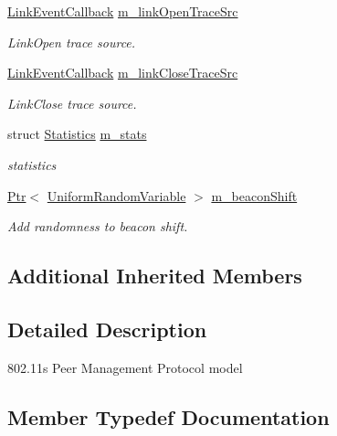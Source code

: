\begin{DoxyCompactItemize}
\hyperlink{classns3_1_1dot11s_1_1PeerManagementProtocol_abd87274ae9ac4498dbd5a8acfe7e9efa}{Link\+Event\+Callback} \hyperlink{classns3_1_1dot11s_1_1PeerManagementProtocol_a33560f4e34a457118de89f3ed3859d4e}{m\+\_\+link\+Open\+Trace\+Src}
\begin{DoxyCompactList}\small\item\em Link\+Open trace source. \end{DoxyCompactList}\item 
\hyperlink{classns3_1_1dot11s_1_1PeerManagementProtocol_abd87274ae9ac4498dbd5a8acfe7e9efa}{Link\+Event\+Callback} \hyperlink{classns3_1_1dot11s_1_1PeerManagementProtocol_ab814d2f94277d15843a33433b31d82f8}{m\+\_\+link\+Close\+Trace\+Src}
\begin{DoxyCompactList}\small\item\em Link\+Close trace source. \end{DoxyCompactList}\item 
struct \hyperlink{structns3_1_1dot11s_1_1PeerManagementProtocol_1_1Statistics}{Statistics} \hyperlink{classns3_1_1dot11s_1_1PeerManagementProtocol_a3f618c99718829447348b1ad19b208d7}{m\+\_\+stats}
\begin{DoxyCompactList}\small\item\em statistics \end{DoxyCompactList}\item 
\hyperlink{classns3_1_1Ptr}{Ptr}$<$ \hyperlink{classns3_1_1UniformRandomVariable}{Uniform\+Random\+Variable} $>$ \hyperlink{classns3_1_1dot11s_1_1PeerManagementProtocol_aa585248112e462ce3af050830715416b}{m\+\_\+beacon\+Shift}
\begin{DoxyCompactList}\small\item\em Add randomness to beacon shift. \end{DoxyCompactList}\end{DoxyCompactItemize}
\subsection*{Additional Inherited Members}


\subsection{Detailed Description}
802.\+11s Peer Management Protocol model 

\subsection{Member Typedef Documentation}
